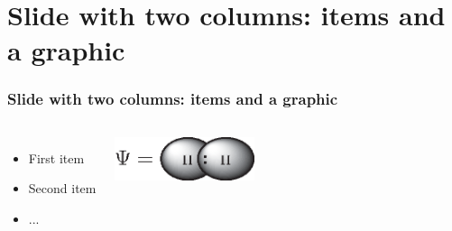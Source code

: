 \documentclass[]{beamer}
\begin{document}
\section{Slide with two columns: items and a graphic}
\begin{frame}
  \frametitle{Slide with two columns: items and a graphic}   %
  \begin{columns}[c]
  \column{2in}  %
  \begin{itemize}
  \item<1-> First item
  \item<2-> Second item
  \item<3-> ...
  \end{itemize}
  \column{2in}
  \includegraphics[height=0.5in]{figures/coulson.eps}
  \end{columns}
\end{frame}
\end{document}
